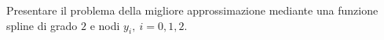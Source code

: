 Presentare il problema della migliore approssimazione mediante 
una funzione spline di grado $2$ e nodi ${y_i}, \ i=0, 1, 2$.
